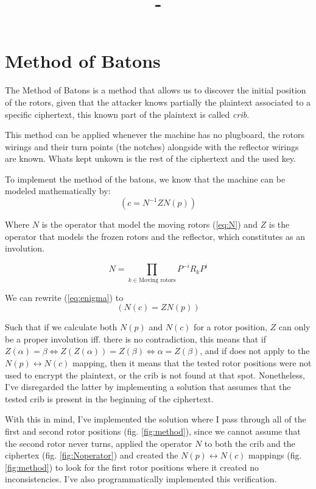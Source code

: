 \documentclass{article}
\title{\textit{\course} - \labName}
\author{\me}
\begin{document}
\maketitle
\section{Method of Batons}
The Method of Batons is a method that allows us to discover the initial position of the rotors, given that the attacker knows partially the plaintext associated to a specific ciphertext, this known part of the plaintext is called \textit{crib}.

This method can be applied whenever the machine has no plugboard, the rotors wirings and their turn points (the notches) alongside with the reflector wirings are known.
Whats kept unkown is the rest of the ciphertext and the used key.

To implement the method of the batons, we know that the machine can be modeled mathematically by:
\begin{equation}
    \left( c = N^{-1} Z N (p) \right)
    \label{eq:enigma}
\end{equation}

Where $N$ is the operator that model the moving rotors (\ref{eq:N}) and $Z$ is the operator that models the frozen rotors and the reflector, which constitutes as an involution.

\begin{equation}
    N = \prod_{k \in \text{Moving rotors}} P^{-i} R_k P^{i}
    \label{eq:N}
\end{equation}

We can rewrite (\ref{eq:enigma}) to
\begin{equation}
    \left( N(c) = Z N (p) \right)
    \label{eq:enigma2}
\end{equation}

Such that if we calculate both $N(p)$ and $N(c)$ for a rotor position, $Z$ can only be a proper involution iff. there is no contradiction, this means that if $Z(\alpha) = \beta \Leftrightarrow Z(Z(\alpha)) = Z(\beta) \Leftrightarrow \alpha = Z(\beta)$, and if does not apply to the $N(p) \leftrightarrow N(c)$ mapping, then it means that the tested rotor positions were not used to encrypt the plaintext, or the crib is not found at that spot. Nonetheless, I've disregarded the latter by implementing a solution that assumes that the tested crib is present in the beginning of the ciphertext.

With this in mind, I've implemented the solution where I pass through all of the first and second rotor positions (fig. \ref{fig:method}), since we cannot assume that the second rotor never turns, applied the operator $N$ to both the crib and the ciphertex (fig. \ref{fig:Noperator}) and created the $N(p) \leftrightarrow N(c)$ mappings (fig. \ref{fig:method}) to look for the first rotor positions where it created no inconsistencies.
I've also programmatically implemented this verification.
\end{document}
